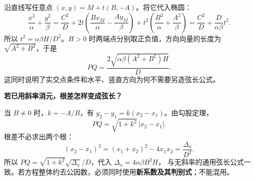 \begin{proofbox}
沿直线写任意点 $(x,y)=M+t(B,-A)$。将它代入椭圆：
\[
 \frac{x^2}{\alpha}+\frac{y^2}{\beta}
 =\frac{C^2}{D}+2t\left(\frac{Bx_M}{\alpha}-\frac{Ay_M}{\beta}\right)
 +t^2\left(\frac{B^2}{\alpha}+\frac{A^2}{\beta}\right)
 =\frac{C^2}{D}+\frac{D}{\alpha\beta}t^2.
\]
所以 $t^2=\alpha\beta H/D^2$。$H>0$ 时两端点分别取正负值，方向向量的长度为
$\sqrt{A^2+B^2}$，于是
\[
 \boxed{PQ=\frac{2\sqrt{\alpha\beta(A^2+B^2)H}}{D}}.
\]
这同时说明了实交点条件和水平、竖直方向为何不需要另造弦长公式。

\tcbbreak
\textbf{若已用斜率消元，根差怎样变成弦长？}

当 $B\ne0$ 时，$k=-A/B$，有 $y_2-y_1=k(x_2-x_1)$。由勾股定理，
\[
 PQ=\sqrt{1+k^2}\,|x_2-x_1|.
\]
根差不必求出两个根：
\[
 (x_2-x_1)^2=(x_1+x_2)^2-4x_1x_2=\frac{\Delta_x}{D^2}.
\]
所以 $PQ=\sqrt{1+k^2}\sqrt{\Delta_x}/D$，代入 $\Delta_x=4\alpha\beta B^2H$，
与无斜率的通用弦长公式一致。若方程整体约去公因数，必须同时使用\textbf{新系数及其判别式}；不能混用。
\end{proofbox}
